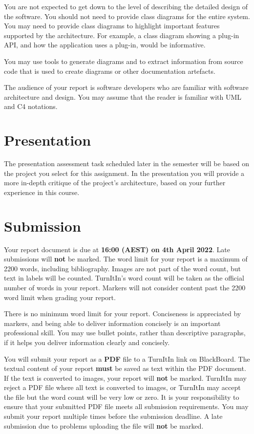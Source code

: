 \documentclass{csse4400}
\begin{document}
You are not expected to get down to the level of describing the detailed design of the software.
You should not need to provide class diagrams for the entire system.
You may need to provide class diagrams to highlight important features supported by the architecture.
For example, a class diagram showing a plug-in API, and how the application uses a plug-in, would be informative.

You may use tools to generate diagrams and to extract information from source code that is used to create diagrams or other documentation artefacts.

The audience of your report is software developers who are familiar with software architecture and design.
You may assume that the reader is familiar with UML and C4 notations.


\section{Presentation}
The presentation assessment task scheduled later in the semester will be based on the project you select for this assignment.
In the presentation you will provide a more in-depth critique of the project's architecture, based on your further experience in this course.


\section{Submission}
Your report document is due at \textbf{16:00 (AEST) on 4th April 2022}. Late submissions will \textbf{not} be marked.
The word limit for your report is a maximum of 2200 words, including bibliography.
Images are not part of the word count, but text in labels will be counted.
TurnItIn's word count will be taken as the official number of words in your report.
Markers will not consider content past the 2200 word limit when grading your report.

There is no minimum word limit for your report.
Conciseness is appreciated by markers, and being able to deliver information concisely is an important professional skill.
You may use bullet points, rather than descriptive paragraphs, if it helps you deliver information clearly and concisely.

You will submit your report as a \textbf{PDF} file to a TurnItIn link on BlackBoard.
The textual content of your report \textbf{must} be saved as text within the PDF document.
If the text is converted to images, your report will \textbf{not} be marked.
TurnItIn may reject a PDF file where all text is converted to images, or
TurnItIn may accept the file but the word count will be very low or zero.
It is your responsibility to ensure that your submitted PDF file meets all submission requirements.
You may submit your report multiple times before the submission deadline.
A late submission due to problems uploading the file will \textbf{not} be marked.
\end{document}
